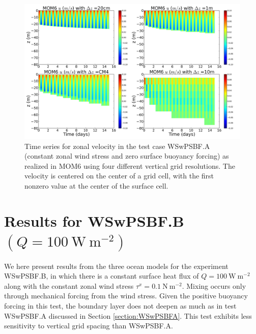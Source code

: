 \begin{figure}[h!t]
\begin{center}
\includegraphics[angle=0,width=14cm]{./figs/MOM6/WSwPSBF_A_MOM6_zonal_velocity.png}
\caption[Zonal velocity from MOM6 for WSwPSBF.A ]{\sf Time series for
  zonal velocity in the test case WSwPSBF.A (constant zonal wind
  stress and zero surface buoyancy forcing) as realized in MOM6 using
  four different vertical grid resolutions. The velocity is centered
  on the center of a grid cell, with the first nonzero value at the
  center of the surface cell.}
\label{fig:WSwPSBF_A_MOM6_zonal}
\end{center}
\end{figure}



\clearpage 


\section{Results for WSwPSBF.B $(Q=100~\mbox{W}~\mbox{m}^{-2})$}
\label{section:WSwPSBFB}

We here present results from the three ocean models for the experiment
WSwPSBF.B, in which there is a constant surface heat flux of
$Q=100~\mbox{W}~\mbox{m}^{-2}$ along with the constant zonal wind
stress $\tau^{x} = 0.1~\mbox{N}~\mbox{m}^{-2}$.  Mixing occurs only
through mechanical forcing from the wind stress.  Given the positive
buoyancy forcing in this test, the boundary layer does not deepen as
much as in test WSwPSBF.A discussed in Section \ref{section:WSwPSBFA}.
This test exhibits less sensitivity to vertical grid spacing than
WSwPSBF.A.  


